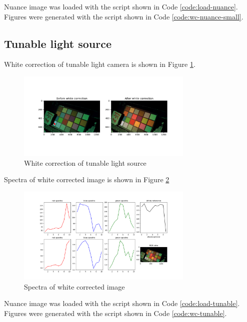 Nuance image was loaded with the script shown in Code \ref{code:load-nuance}.
Figures were generated with the script shown in Code \ref{code:wc-nuance-small}.


\subsection{Tunable light source}
White correction of tunable light camera is shown in Figure \ref{fig:wc-tunable}.

\begin{figure}[H]
    \centering
    \caption{White correction of tunable light source}
    \label{fig:wc-tunable}
    \includegraphics[width=0.75\textwidth]{./fig-task1/wc-tunable.png}
\end{figure}

Spectra of white corrected image is shown in Figure \ref{fig:wc-tunable-spectra}

\begin{figure}[H]
    \centering
    \caption{Spectra of white corrected image}
    \label{fig:wc-tunable-spectra}
    \includegraphics[width=0.75\textwidth]{./fig-task1/wc-tunable-spectra.png}
\end{figure}

Nuance image was loaded with the script shown in Code \ref{code:load-tunable}.
Figures were generated with the script shown in Code \ref{code:wc-tunable}.

